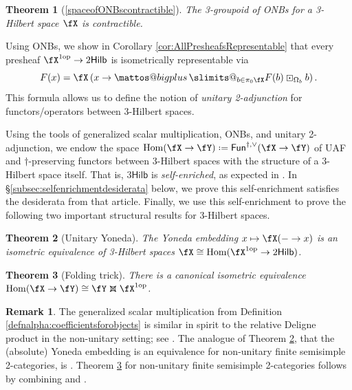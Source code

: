 \documentclass[12pt, reqno]{amsart}
\makeatletter
\DeclareMathOperator{\Hom}{Hom}
\newcommand{\op}{\mathrm{op}}
\newcommand{\Fun}{\mathsf{Fun}}
\newcommand{\Hilb}{\mathsf{Hilb}}
\theoremstyle{plain}
\newtheorem{thmalpha}{Theorem}
\theoremstyle{definition}
\newtheorem{rem}[thm]{Remark}
\newcommand{\coloneq}{:=}
\def\coloneq{\mathrel{\vcenter{\baselineskip0.55ex\lineskiplimit0pt\hbox{\upshape.}\hbox{\upshape.}}}=}
\newcommand{\dtimesaux}[4]{\mathbin{\vcenter{\hbox{\raisebox{#4}{\scalebox{#3}{\ooalign{\hfil$\vcenter{\hbox{$#1\times$}}$\hfil\cr\hfil$\vcenter{\hbox{\mbox{#2\upshape\wasylozenge}}}$\hfil\cr}}}}}}}
\newcommand{\dtimes}{%
  \mathchoice
    {\dtimesaux{\displaystyle}{\normalsize}{1.15}{0.35ex}}
    {\dtimesaux{\textstyle}{\normalsize}{1.15}{0.35ex}}
    {\dtimesaux{\scriptstyle}{\scriptsize}{1.0}{0ex}}
    {\dtimesaux{\scriptscriptstyle}{\tiny}{1.0}{0ex}}%
}
\newcommand{\threehilbtimes}{\dtimes}
\newcommand{\bigboxplus}{%
  \DOTSB\mathop{\mathpalette\mattos@bigplus\relax}\slimits@
}
\newcommand\mattos@bigplus[2]{%
  \vcenter{\hbox{%
    \sbox\z@{$#1\sum$}%
    \resizebox{!}{0.9\dimexpr\ht\z@+\dp\z@}{\raisebox{\depth}{$\m@th#1\boxplus$}}%
  }}%
  \vphantom{\sum}%
}
\makeatother
\begin{document}
\begin{thmalpha}[\ref{spaceofONBscontractible}]
The 3-groupoid of ONBs for a 3-Hilbert space $\fX$ is contractible.
\end{thmalpha}

Using ONBs, we show in Corollary \ref{cor:AllPresheafsRepresentable} that every presheaf $\fX^{1\op}\to 2\Hilb$ is isometrically representable via 
$$
F(x)=
\fX\left(x\to
\bigboxplus_{b\in\pi_0\fX} F(b)\boxdot_{\Omega_b} b\right).
$$
This formula allows us to define the notion of \emph{unitary 2-adjunction} for functors/operators between 3-Hilbert spaces.

Using the tools of generalized scalar multiplication, ONBs, and unitary 2-adjunction, we endow the space $\Hom(\fX \to \fY)\coloneq\Fun^{\dag,\vee}(\fX\to \fY)$ of UAF and $\dag$-preserving functors between 3-Hilbert spaces with the structure of a 3-Hilbert space itself.
That is, $3\Hilb$ is \emph{self-enriched}, as expected in \cite[\S5.3]{MR5078555}.
In \S\ref{subsec:selfenrichmentdesiderata} below, we prove this self-enrichment satisfies the desiderata from that article.
Finally, we use this self-enrichment to prove the following two important structural results for 3-Hilbert spaces.

\begin{thmalpha}[Unitary Yoneda]\label{thm:unitaryyoneda}
The Yoneda embedding $x\mapsto \fX(-\to x)$ is an isometric equivalence of 3-Hilbert spaces $\fX\cong \Hom(\fX^{1\op}\to 2\Hilb)$.
\end{thmalpha}

\begin{thmalpha}[Folding trick]\label{thm:foldingtrick}
There is a canonical isometric equivalence
$\Hom(\fX\to \fY)\cong \fY\threehilbtimes \fX^{1\op}$.
\end{thmalpha}

\begin{rem}
\label{rem:NonUnitary}
The generalized scalar multiplication from Definition \ref{defnalpha:coefficientsforobjects} is similar in spirit to the relative Deligne product in the non-unitary setting; see \cite[\S3]{MR4600461}.
The analogue of Theorem \ref{thm:unitaryyoneda}, that the (absolute) Yoneda embedding is an equivalence for non-unitary finite semisimple 2-categories, is \cite[Prop.~1.4.11]{1812.11933}.
Theorem \ref{thm:foldingtrick} for non-unitary finite semisimple 2-categories follows by combining \cite[Thm.~5.1.2]{MR4600461} and \cite[Thm.~2.2.4]{2311.16827}.
\end{rem}
\end{document}
